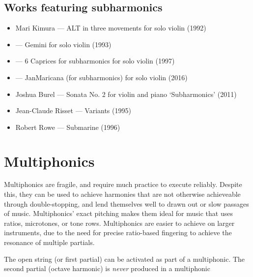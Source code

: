


\subsection{Works featuring subharmonics }\label{sec:subharmonicsLiterature}

\begin{itemize}
    \item Mari Kimura --- ALT in three movements for solo violin (1992)
    \item --- Gemini for solo violin (1993)
    \item --- 6 Caprices for subharmonics for solo violin (1997) 
    \item --- JanMaricana (for subharmonics) for solo violin (2016)
    \item Joshua Burel --- Sonata No. 2 for violin and piano `Subharmonics' (2011)
    \item Jean-Claude Risset --- Variants (1995)
    \item Robert Rowe --- Submarine (1996)
\end{itemize}



\section{Multiphonics}\label{sec:multiphonics}

Multiphonics are fragile, and require much practice to execute reliably.
Despite this, they can be used to achieve harmonies that are not otherwise achieveable through double-stopping, and lend themselves well to drawn out or slow passages of music. 
Multiphonics' exact pitching makes them ideal for music that uses ratios, microtones, or tone rows. 
Multiphonics are easier to achieve on larger instruments, due to the need for precise ratio-based fingering to achieve the resonance of multiple partials.\autocite[http://www.cellomap.com/index/the-string/multiphonics-and-other-multiple-sounds/frequency-analysis.html]{fallowfieldCelloMap}

The open string (or first partial) can be activated as part of a multiphonic.\autocite[161]{welbanksFoundationsModernCello}
The second partial (octave harmonic) is \emph{never} produced in a multiphonic

